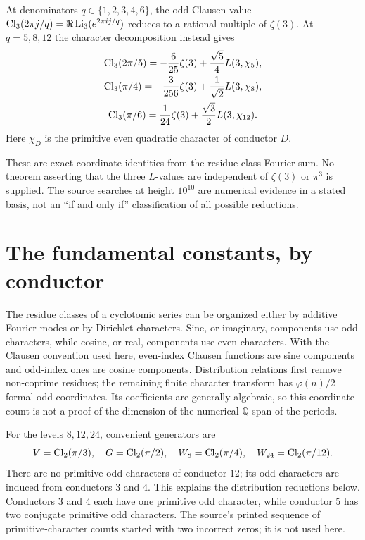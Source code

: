 \begin{proposition}
At denominators $q\in\{1,2,3,4,6\}$, the odd Clausen value
$\operatorname{Cl}_3(2\pi j/q)=\Re\operatorname{Li}_3(e^{2\pi i j/q})$ reduces to a rational multiple
of $\zeta(3)$. At $q=5,8,12$ the character decomposition instead gives
\begin{gather*}
\operatorname{Cl}_3(2\pi/5)=-\frac6{25}\zeta(3)+\frac{\sqrt5}{4}L(3,\chi_5),\\
\operatorname{Cl}_3(\pi/4)=-\frac3{256}\zeta(3)+\frac1{\sqrt2}L(3,\chi_8),\\
\operatorname{Cl}_3(\pi/6)=\frac1{24}\zeta(3)+\frac{\sqrt3}{2}L(3,\chi_{12}).
\end{gather*}
Here $\chi_D$ is the primitive even quadratic character of conductor $D$.
\end{proposition}
These are exact coordinate identities from the residue-class Fourier sum.
No theorem asserting that the three $L$-values are independent of
$\zeta(3)$ or $\pi^3$ is supplied. The source searches at height $10^{10}$
are numerical evidence in a stated basis, not an ``if and only if''
classification of all possible reductions.

\section{The fundamental constants, by conductor}
The residue classes of a cyclotomic series can be organized either by
additive Fourier modes or by Dirichlet characters. Sine, or imaginary,
components use odd characters, while cosine, or real, components use even
characters. With the Clausen convention used here, even-index Clausen
functions are sine components and odd-index ones are cosine components.
Distribution relations first remove non-coprime
residues; the remaining finite character transform has $\varphi(n)/2$
formal odd coordinates. Its coefficients are generally algebraic, so this
coordinate count is not a proof of the dimension of the numerical
$\mathbb Q$-span of the periods.

For the levels $8,12,24$, convenient generators are
\[
V=\operatorname{Cl}_2(\pi/3),\quad G=\operatorname{Cl}_2(\pi/2),\quad
W_8=\operatorname{Cl}_2(\pi/4),\quad W_{24}=\operatorname{Cl}_2(\pi/12).
\]
There are no primitive odd characters of conductor $12$; its odd characters
are induced from conductors $3$ and $4$. This explains the distribution
reductions below. Conductors $3$ and $4$ each have one primitive odd
character, while conductor $5$ has two conjugate primitive odd characters.
The source's printed sequence of primitive-character counts started with
two incorrect zeros; it is not used here.

